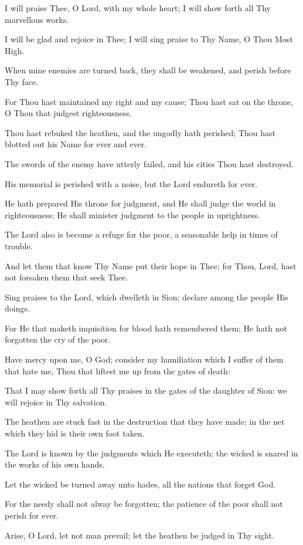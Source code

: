 I will praise Thee, O Lord, with my whole heart; I will show forth all Thy marvellous works.

I will be glad and rejoice in Thee; I will sing praise to Thy Name, O Thou Most High.

When mine enemies are turned back, they shall be weakened, and perish before Thy face.

For Thou hast maintained my right and my cause; Thou hast sat on the throne, O Thou that judgest righteousness.

Thou hast rebuked the heathen, and the ungodly hath perished; Thou hast blotted out his Name for ever and ever.

The swords of the enemy have utterly failed, and his cities Thou hast destroyed.

His memorial is perished with a noise, but the Lord endureth for ever.

He hath prepared His throne for judgment, and He shall judge the world in righteousness; He shall minister judgment to the people in uprightness.

The Lord also is become a refuge for the poor, a seasonable help in times of trouble.

And let them that know Thy Name put their hope in Thee; for Thou, Lord, hast not forsaken them that seek Thee.

Sing praises to the Lord, which dwelleth in Sion; declare among the people His doings.

For He that maketh inquisition for blood hath remembered them; He hath not forgotten the cry of the poor.

Have mercy upon me, O God; consider my humiliation which I suffer of them that hate me, Thou that liftest me up from the gates of death:

That I may show forth all Thy praises in the gates of the daughter of Sion: we will rejoice in Thy salvation.

The heathen are stuck fast in the destruction that they have made; in the net which they hid is their own foot taken.

The Lord is known by the judgments which He executeth; the wicked is snared in the works of his own hands.

Let the wicked be turned away unto hades, all the nations that forget God.

For the needy shall not alway be forgotten; the patience of the poor shall not perish for ever.

Arise, O Lord, let not man prevail; let the heathen be judged in Thy sight.

